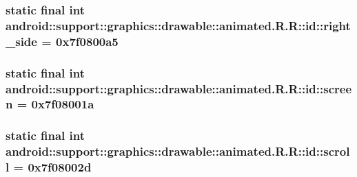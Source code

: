 \hypertarget{classandroid_1_1support_1_1graphics_1_1drawable_1_1animated_1_1_r_1_1id_54e94466e60d747e98a3052afc12b014}{
\subsubsection[{right\_\-side}]{\setlength{\rightskip}{0pt plus 5cm}static final int android::support::graphics::drawable::animated.R.R::id::right\_\-side = 0x7f0800a5}}
\label{classandroid_1_1support_1_1graphics_1_1drawable_1_1animated_1_1_r_1_1id_54e94466e60d747e98a3052afc12b014}


\hypertarget{classandroid_1_1support_1_1graphics_1_1drawable_1_1animated_1_1_r_1_1id_f5e2617de658d6598044a4d8ce492a35}{
\subsubsection[{screen}]{\setlength{\rightskip}{0pt plus 5cm}static final int android::support::graphics::drawable::animated.R.R::id::screen = 0x7f08001a}}
\label{classandroid_1_1support_1_1graphics_1_1drawable_1_1animated_1_1_r_1_1id_f5e2617de658d6598044a4d8ce492a35}


\hypertarget{classandroid_1_1support_1_1graphics_1_1drawable_1_1animated_1_1_r_1_1id_c94d188d385ca6b8d43fc5bc312a021c}{
\subsubsection[{scroll}]{\setlength{\rightskip}{0pt plus 5cm}static final int android::support::graphics::drawable::animated.R.R::id::scroll = 0x7f08002d}}
\label{classandroid_1_1support_1_1graphics_1_1drawable_1_1animated_1_1_r_1_1id_c94d188d385ca6b8d43fc5bc312a021c}


